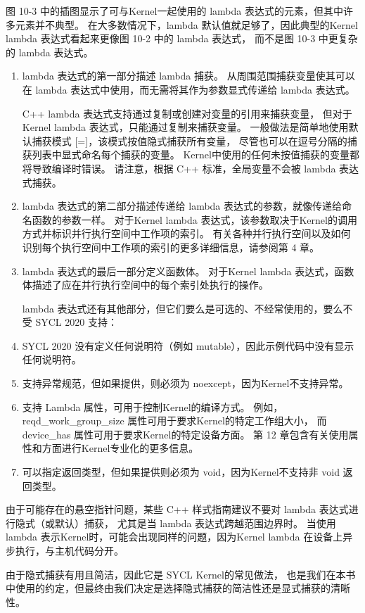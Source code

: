 图 10-3 中的插图显示了可与Kernel一起使用的 lambda 表达式的元素，但其中许多元素并不典型。 
在大多数情况下，lambda 默认值就足够了，因此典型的Kernel lambda 表达式看起来更像图 10-2 中的 lambda 表达式，
而不是图 10-3 中更复杂的 lambda 表达式。

\begin{enumerate}
	\item lambda 表达式的第一部分描述 lambda 捕获。 
	从周围范围捕获变量使其可以在 lambda 表达式中使用，而无需将其作为参数显式传递给 lambda 表达式。

	C++ lambda 表达式支持通过复制或创建对变量的引用来捕获变量，
	但对于Kernel lambda 表达式，只能通过复制来捕获变量。 
	一般做法是简单地使用默认捕获模式 [=]，该模式按值隐式捕获所有变量，
	尽管也可以在逗号分隔的捕获列表中显式命名每个捕获的变量。 
	Kernel中使用的任何未按值捕获的变量都将导致编译时错误。 
	请注意，根据 C++ 标准，全局变量不会被 lambda 表达式捕获。

	\item lambda 表达式的第二部分描述传递给 lambda 表达式的参数，就像传递给命名函数的参数一样。 
	对于Kernel lambda 表达式，该参数取决于Kernel的调用方式并标识并行执行空间中工作项的索引。 
	有关各种并行执行空间以及如何识别每个执行空间中工作项的索引的更多详细信息，请参阅第 4 章。

	\item lambda 表达式的最后一部分定义函数体。 
	对于Kernel lambda 表达式，函数体描述了应在并行执行空间中的每个索引处执行的操作。

	lambda 表达式还有其他部分，但它们要么是可选的、不经常使用的，要么不受 SYCL 2020 支持：

	\item SYCL 2020 没有定义任何说明符（例如 mutable），因此示例代码中没有显示任何说明符。

	\item 支持异常规范，但如果提供，则必须为 noexcept，因为Kernel不支持异常。

	\item 支持 Lambda 属性，可用于控制Kernel的编译方式。 
	例如，reqd\_work\_group\_size 属性可用于要求Kernel的特定工作组大小，
	而 device\_has 属性可用于要求Kernel的特定设备方面。 
	第 12 章包含有关使用属性和方面进行Kernel专业化的更多信息。

	\item 可以指定返回类型，但如果提供则必须为 void，因为Kernel不支持非 void 返回类型。
\end{enumerate}

\begin{remark}
由于可能存在的悬空指针问题，某些 C++ 样式指南建议不要对 lambda 表达式进行隐式（或默认）捕获，
尤其是当 lambda 表达式跨越范围边界时。
当使用 lambda 表示Kernel时，可能会出现同样的问题，因为Kernel lambda 在设备上异步执行，与主机代码分开。

由于隐式捕获有用且简洁，因此它是 SYCL Kernel的常见做法，
也是我们在本书中使用的约定，但最终由我们决定是选择隐式捕获的简洁性还是显式捕获的清晰性。
\end{remark}

